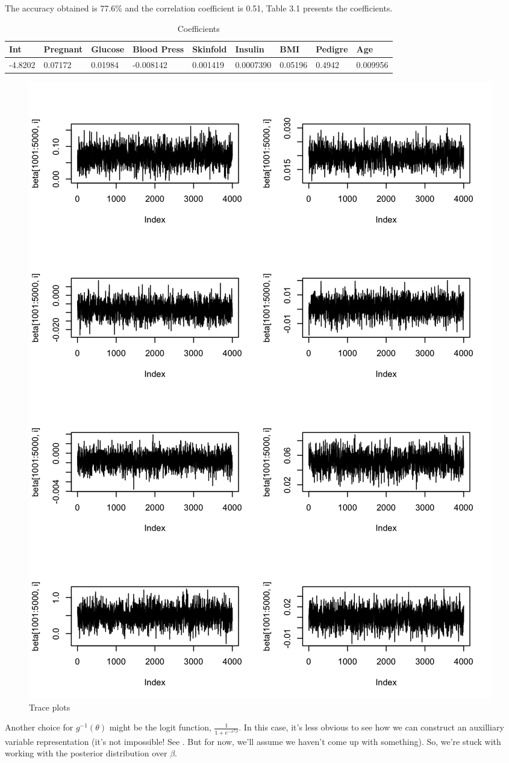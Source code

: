\documentclass[twoside]{article}
\begin{document}
{\color{blue}

The accuracy obtained is 77.6\% and the correlation coefficient is 0.51, Table 3.1 presents the coefficients.

\begin{table}[H]
	\centering
	\caption{Coefficients}
	\begin{tabular}{|l|l|l|l|l|l|l|l|l|}
		\hline
		Int     & Pregnant & Glucose & Blood Press & Skinfold & Insulin   & BMI     & Pedigre & Age      \\ \hline
		-4.8202 & 0.07172  & 0.01984 & -0.008142   & 0.001419 & 0.0007390 & 0.05196 & 0.4942  & 0.009956 \\ \hline
	\end{tabular}
\end{table}

\begin{figure}[H]
	\begin{center}
		\includegraphics[width=.8\linewidth]{Section3R/Figures/P3_1_Trace.png}
		\caption{Trace plots}
	\end{center}
\end{figure}
} %



\newpage
Another choice for $g^{-1}(\theta)$ might be the logit function, $\frac{1}{1+e^{-x^T\beta}}$. In this case, it's less obvious to see how we can construct an auxilliary variable representation (it's not impossible! See \citet{PolScoWin2013}. But for now, we'll assume we haven't come up with something). So, we're stuck with working with the posterior distribution over $\beta$.
\end{document}
